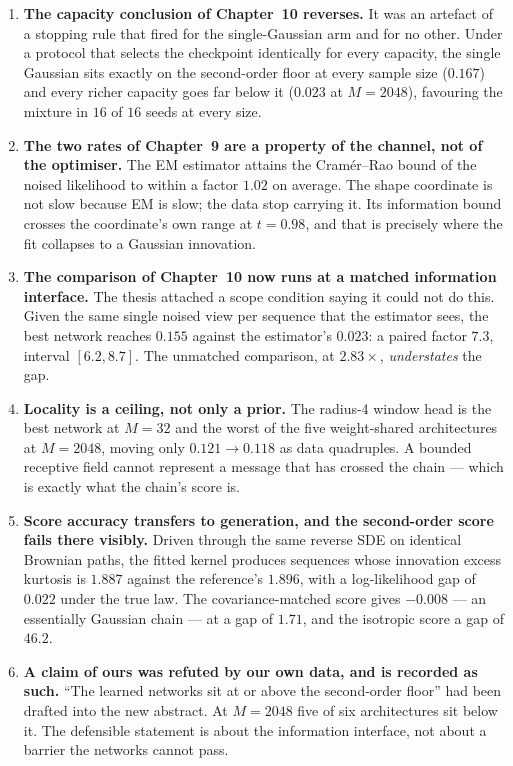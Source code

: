 \documentclass[11pt,a4paper]{article}
\newcommand{\hi}[1]{\textbf{#1}}
\begin{document}
\begin{enumerate}
\item \hi{The capacity conclusion of Chapter~10 reverses.} It was an artefact of a stopping rule
that fired for the single-Gaussian arm and for no other. Under a protocol that selects the
checkpoint identically for every capacity, the single Gaussian sits exactly on the second-order
floor at every sample size ($0.167$) and every richer capacity goes far below it ($0.023$ at
$M=2048$), favouring the mixture in $16$ of $16$ seeds at every size.

\item \hi{The two rates of Chapter~9 are a property of the channel, not of the optimiser.} The EM
estimator attains the Cram\'er--Rao bound of the noised likelihood to within a factor $1.02$ on
average. The shape coordinate is not slow because EM is slow; the data stop carrying it. Its
information bound crosses the coordinate's own range at $t=0.98$, and that is precisely where the
fit collapses to a Gaussian innovation.

\item \hi{The comparison of Chapter~10 now runs at a matched information interface.} The thesis
attached a scope condition saying it could not do this. Given the same single noised view per
sequence that the estimator sees, the best network reaches $0.155$ against the estimator's
$0.023$: a paired factor $7.3$, interval $[6.2,8.7]$. The unmatched comparison, at $2.83\times$,
\emph{understates} the gap.

\item \hi{Locality is a ceiling, not only a prior.} The radius-4 window head is the best network at
$M=32$ and the worst of the five weight-shared architectures at $M=2048$, moving only
$0.121\rightarrow0.118$ as data quadruples. A bounded receptive field cannot represent a message
that has crossed the chain --- which is exactly what the chain's score is.

\item \hi{Score accuracy transfers to generation, and the second-order score fails there
visibly.} Driven through the same reverse SDE on identical Brownian paths, the fitted kernel
produces sequences whose innovation excess kurtosis is $1.887$ against the reference's $1.896$,
with a log-likelihood gap of $0.022$ under the true law. The covariance-matched score gives
$-0.008$ --- an essentially Gaussian chain --- at a gap of $1.71$, and the isotropic score a gap of
$46.2$.

\item \hi{A claim of ours was refuted by our own data, and is recorded as such.} ``The learned
networks sit at or above the second-order floor'' had been drafted into the new abstract. At
$M=2048$ five of six architectures sit below it. The defensible statement is about the information
interface, not about a barrier the networks cannot pass.
\end{enumerate}
\end{document}
